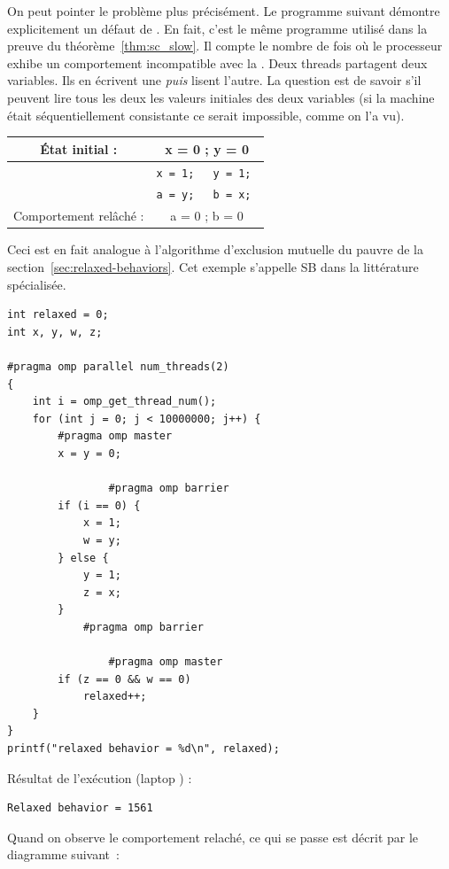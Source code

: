 On peut pointer le problème plus précisément. Le programme suivant démontre
explicitement un défaut de . En fait, c'est le
même programme utilisé dans la preuve du théorème~\ref{thm:sc_slow}. Il compte
le nombre de fois où le processeur exhibe un comportement incompatible avec la
. Deux threads partagent deux variables. Ils en
écrivent une \emph{puis} lisent l'autre. La question est de savoir s'il peuvent
lire tous les deux les valeurs initiales des deux variables (si la machine était
séquentiellement consistante ce serait impossible, comme on l'a vu).

\begin{center}
\begin{tabular}{|c|p{2cm}||p{2cm}|}
  \hline
  État initial : & \multicolumn{2}{c|}{x = 0 ; y = 0} \\
  \hline
  & \tt x = 1; & \tt y = 1; \\
  & \tt a = y; & \tt b = x; \\
  \hline
  Comportement relâché : & \multicolumn{2}{c|}{a = 0 ; b = 0} \\
  \hline
\end{tabular}
\end{center}

Ceci est en fait analogue à l'algorithme d'\og exclusion mutuelle du pauvre\fg{}
de la section~\ref{sec:relaxed-behaviors}. Cet exemple s'appelle SB dans la
littérature spécialisée.

\begin{myfilet}
\begin{verbatim}
int relaxed = 0;
int x, y, w, z;

#pragma omp parallel num_threads(2)
{
	int i = omp_get_thread_num();
	for (int j = 0; j < 10000000; j++) {
		#pragma omp master
		x = y = 0;

                #pragma omp barrier
		if (i == 0) {
			x = 1;
			w = y;
		} else {	
			y = 1;
			z = x;
		}
	        #pragma omp barrier

                #pragma omp master
		if (z == 0 && w == 0)
			relaxed++;
	}
}
printf("relaxed behavior = %d\n", relaxed);
\end{verbatim}  
\end{myfilet}

Résultat de l'exécution (laptop ) :
\begin{verbatim}
Relaxed behavior = 1561
\end{verbatim}

Quand on observe le comportement \og relaché\fg, ce qui se passe est décrit par
le diagramme suivant~:

